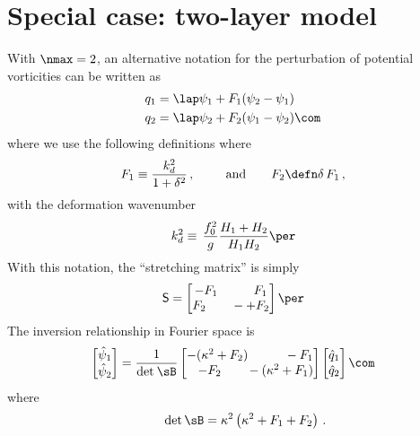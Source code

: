 \documentclass[11pt]{article}
\newcommand{\sS}{\mathsf{S}}
\begin{document}
\section*{Special case: two-layer model}
With $\nmax = 2$, an alternative notation for the perturbation of potential vorticities can be written as
\begin{align}
    q_1 &= \lap \psi_1 + F_1 (\psi_2 - \psi_1) \nonumber\\
    q_2 &= \lap \psi_2 + F_2 (\psi_1  - \psi_2)\com
\end{align}
where we use the following definitions
where
\begin{equation}
F_1 \equiv \frac{k_d^2}{1 + \delta^2}\,, \qquad \:\:\text{and} \qquad F_2 \defn \delta \,F_1\,,
\end{equation}
with the deformation wavenumber
\begin{equation}
k_d^2 \equiv \, \frac{f_0^2}{g} \frac{H_1+H_2}{H_1 H_2} \per
\end{equation}
With this notation, the ``stretching matrix'' is simply
\begin{equation}
\sS = \begin{bmatrix}
- F_1 \qquad \:\:\:\:F_1\\
F_2 \qquad -  + F_2
\end{bmatrix}\per
\end{equation}
The inversion relationship in Fourier space is
\begin{equation}
\begin{bmatrix}
\hat{\psi}_1\\
\hat{\psi}_2\\
\end{bmatrix}
= \frac{1}{\text{det} \: \sB}
\begin{bmatrix}
-(\kappa^2 + F_2) \qquad \:\:\:\:-F_1\\
\:\:\:\: -F_2 \qquad - (\kappa^2 + F_1)
\end{bmatrix}
\begin{bmatrix}
\hat{q}_1\\
\hat{q}_2\\
\end{bmatrix}\com
\end{equation}
where 
\begin{equation}
\qquad \text{det}\, \sB = \kappa^2\left(\kappa^2 + F_1 + F_2\right)\,.
\end{equation}
\end{document}
